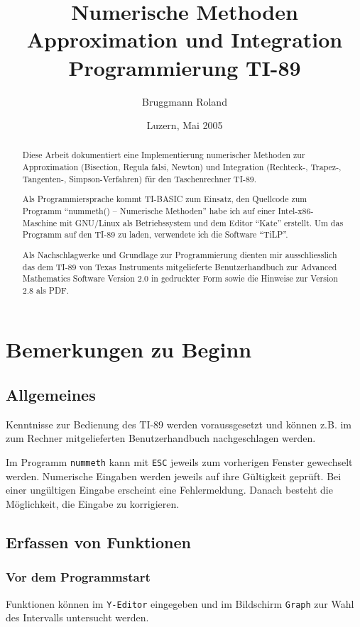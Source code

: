 \documentclass[a5paper,9pt]{scrreprt}
\author{Bruggmann Roland}
\title{Numerische Methoden\\Approximation und Integration\\Programmierung TI-89}
\date{Luzern, Mai 2005}
\begin{document}
\maketitle[-1] %

\begin{abstract}
Diese Arbeit dokumentiert eine Implementierung numerischer Methoden zur Approximation (Bisection, Regula falsi, Newton) und Integration (Rechteck-, Trapez-, Tangenten-, Simpson-Verfahren) f\"ur den Taschenrechner TI-89.

Als Programmiersprache kommt TI-BASIC zum Einsatz, den Quellcode zum Programm \enquote{nummeth() -- Numerische Methoden} habe ich auf einer Intel-x86-Maschine mit GNU/Linux als Betriebssystem und dem Editor \enquote{Kate} erstellt. Um das Programm auf den TI-89 zu laden, verwendete ich die Software \enquote{TiLP}.

Als Nachschlagwerke und Grundlage zur Programmierung dienten mir ausschliesslich das dem TI-89 von Texas Instruments mitgelieferte Benutzerhandbuch zur Advanced Mathematics Software Version 2.0 \cite{AVM99} in gedruckter Form sowie die Hinweise zur Version 2.8 \cite{AVM02} als PDF.
\end{abstract}

\setcounter{secnumdepth}{2}
\tableofcontents

\chapter{Bemerkungen zu Beginn}
\section{Allgemeines}
Kenntnisse zur Bedienung des TI-89 werden voraussgesetzt und k\"onnen z.B. im zum Rechner mitgelieferten Benutzerhandbuch \cite{AVM99} nachgeschlagen werden.

Im Programm \verb|nummeth| kann mit \verb|ESC| jeweils zum vorherigen Fenster gewechselt werden. Numerische Eingaben werden jeweils auf ihre G\"ultigkeit gepr\"uft. Bei einer ung\"ultigen Eingabe erscheint eine Fehlermeldung. Danach besteht die M\"oglichkeit, die Eingabe zu korrigieren.

\section{Erfassen von Funktionen}
\subsection*{Vor dem Programmstart}
Funktionen k\"onnen im \verb|Y-Editor| eingegeben und im Bildschirm \verb|Graph| zur Wahl des Intervalls untersucht werden.
\end{document}
